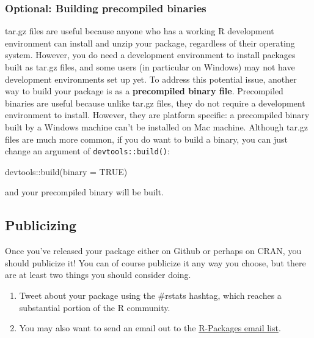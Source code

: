 \documentclass[
]{book}
\newenvironment{Shaded}{\begin{snugshade}}{\end{snugshade}}
\newcommand{\AttributeTok}[1]{\textcolor[rgb]{0.77,0.63,0.00}{#1}}
\newcommand{\ConstantTok}[1]{\textcolor[rgb]{0.00,0.00,0.00}{#1}}
\newcommand{\FunctionTok}[1]{\textcolor[rgb]{0.00,0.00,0.00}{#1}}
\newcommand{\NormalTok}[1]{#1}
\newcommand{\SpecialCharTok}[1]{\textcolor[rgb]{0.00,0.00,0.00}{#1}}
\providecommand{\tightlist}{%
  \setlength{\itemsep}{0pt}\setlength{\parskip}{0pt}}
\begin{document}
\hypertarget{optional-building-precompiled-binaries}{%
\subsubsection{Optional: Building precompiled binaries}\label{optional-building-precompiled-binaries}}

tar.gz files are useful because anyone who has a working R development environment can install and unzip your package, regardless of their operating system. However, you do need a development environment to install packages built as tar.gz files, and some users (in particular on Windows) may not have development environments set up yet. To address this potential issue, another way to build your package is as a \textbf{precompiled binary file}. Precompiled binaries are useful because unlike tar.gz files, they do not require a development environment to install. However, they are platform specific: a precompiled binary built by a Windows machine can't be installed on Mac machine. Although tar.gz files are much more common, if you do want to build a binary, you can just change an argument of \texttt{devtools::build()}:

\begin{Shaded}
\begin{Highlighting}[]
\NormalTok{devtools}\SpecialCharTok{::}\FunctionTok{build}\NormalTok{(}\AttributeTok{binary =} \ConstantTok{TRUE}\NormalTok{)}
\end{Highlighting}
\end{Shaded}

and your precompiled binary will be built.

\hypertarget{publicizing}{%
\subsection{Publicizing}\label{publicizing}}

Once you've released your package either on Github or perhaps on CRAN, you should publicize it! You can of course publicize it any way you choose, but there are at least two things you should consider doing.

\begin{enumerate}
\def\labelenumi{\arabic{enumi}.}
\tightlist
\item
  Tweet about your package using the \#rstats hashtag, which reaches a substantial portion of the R community.
\item
  You may also want to send an email out to the \href{https://stat.ethz.ch/mailman/listinfo/r-packages}{R-Packages email list}.
\end{enumerate}
\end{document}
